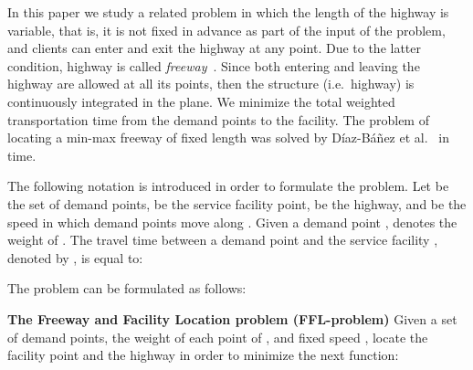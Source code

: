 \documentclass[11pt,a4paper,oneside,onecolumn]{article}
\begin{document}
In this paper we study a related problem in which the length of the
highway is variable, that is, it is not fixed in advance as part
of the input of the problem, and clients can enter and
exit the highway at any point. Due to the latter condition, highway is called
\emph{freeway}~\cite{korman08}. Since both entering and leaving the highway are
allowed at all its points, then the structure (i.e.\ highway) is continuously
integrated in the plane.
We minimize the total weighted
transportation time from the demand points to the facility. The problem
of locating a min-max freeway of fixed length was solved by
D\'iaz-B\'a\~nez et al.~\cite{diaz-banez11-3} in  time.

The following notation is introduced in order to formulate the problem.
Let  be the set of  demand points,  be the service facility
point,  be the highway, and  be the speed in which demand
points move along . Given a demand point ,  denotes the
weight of . The travel time between a demand point  and the
service facility , denoted by , is equal to:


The problem can be formulated as follows:

\medskip

{\bf The Freeway and Facility Location problem (FFL-problem)} Given
a set  of  demand points, the weight  of each point  of
, and fixed speed , locate the facility point  and the
highway  in order to minimize the next function:
\end{document}
